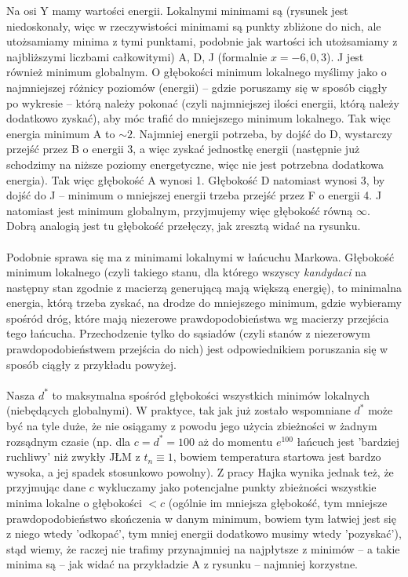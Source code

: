 \documentclass[a4paper]{article}
\theoremstyle{defn}
\theoremstyle{theorem}
\theoremstyle{lemma}
\theoremstyle{cor}
\theoremstyle{fact}
\begin{document}
Na osi Y mamy wartości energii. Lokalnymi minimami są (rysunek jest niedoskonały, więc w rzeczywistości minimami są punkty zbliżone do nich, ale utożsamiamy minima z tymi punktami, podobnie jak wartości ich utożsamiamy z najbliższymi liczbami całkowitymi) A, D, J (formalnie $x=-6, 0, 3$). J jest również minimum globalnym. O głębokości minimum lokalnego myślimy jako o najmniejszej różnicy poziomów (energii) – gdzie poruszamy się w sposób ciągły po wykresie – którą należy pokonać (czyli najmniejszej ilości energii, którą należy dodatkowo zyskać), aby móc trafić do mniejszego minimum lokalnego. Tak więc energia minimum A to $\sim 2$. Najmniej energii potrzeba, by dojść do D, wystarczy przejść przez B o energii 3, a więc zyskać jednostkę energii (następnie już schodzimy na niższe poziomy energetyczne, więc nie jest potrzebna dodatkowa energia). Tak więc głębokość A wynosi 1. Głębokość D natomiast wynosi 3, by dojść do J – minimum o mniejszej energii trzeba przejść przez F o energii 4. J natomiast jest minimum globalnym, przyjmujemy więc głębokość równą $\infty$. Dobrą analogią jest tu głębokość przełęczy, jak zresztą widać na rysunku.\\\\
 Podobnie sprawa się ma z minimami lokalnymi w łańcuchu Markowa. Głębokość minimum lokalnego (czyli takiego stanu, dla którego wszyscy \textit{kandydaci} na następny stan zgodnie z macierzą generującą mają większą energię), to minimalna energia, którą trzeba zyskać, na drodze do mniejszego minimum, gdzie wybieramy spośród dróg, które mają niezerowe prawdopodobieństwa wg macierzy przejścia tego łańcucha. Przechodzenie tylko do sąsiadów (czyli stanów z niezerowym prawdopodobieństwem przejścia do nich) jest odpowiednikiem poruszania się w sposób ciągły z przykładu powyżej.\\\\
Nasza $d^*$ to maksymalna spośród głębokości wszystkich minimów lokalnych (niebędących globalnymi). W praktyce, tak jak już zostało wspomniane $d^*$ może być na tyle duże, że nie osiągamy z powodu jego użycia zbieżności w żadnym rozsądnym czasie (np. dla $c=d^*=100$ aż do momentu $e^{100}$ łańcuch jest 'bardziej ruchliwy' niż zwykły JŁM z $t_n \equiv 1$, bowiem temperatura startowa jest bardzo wysoka, a jej spadek stosunkowo powolny). Z pracy Hajka wynika jednak też, że przyjmując dane $c$ wykluczamy jako potencjalne punkty zbieżności wszystkie minima lokalne o głębokości $<c$ (ogólnie im mniejsza głębokość, tym mniejsze prawdopodobieństwo skończenia w danym minimum, bowiem tym łatwiej jest się z niego wtedy 'odkopać', tym mniej energii dodatkowo musimy wtedy 'pozyskać'), stąd wiemy, że raczej nie trafimy przynajmniej na najpłytsze z minimów – a takie minima są – jak widać na przykładzie A z rysunku – najmniej korzystne.\\\\
\end{document}
